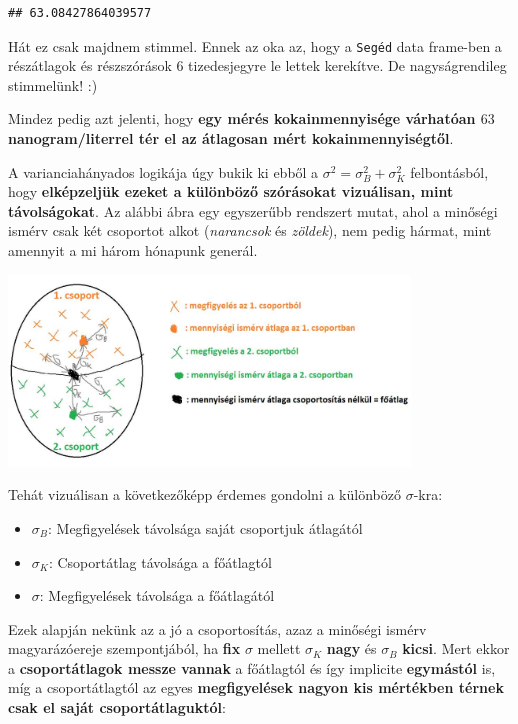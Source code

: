 \documentclass[
]{book}
\providecommand{\tightlist}{%
  \setlength{\itemsep}{0pt}\setlength{\parskip}{0pt}}
\begin{document}
\begin{verbatim}
## 63.08427864039577
\end{verbatim}

Hát ez csak majdnem stimmel. Ennek az oka az, hogy a \texttt{Segéd} data frame-ben a részátlagok és részszórások \(6\) tizedesjegyre le lettek kerekítve. De nagyságrendileg stimmelünk! :)

Mindez pedig azt jelenti, hogy \textbf{egy mérés kokainmennyisége várhatóan \(63\) nanogram/literrel tér el az átlagosan mért kokainmennyiségtől}.

A varianciahányados logikája úgy bukik ki ebből a \(\sigma^2=\sigma_B^2+\sigma_K^2\) felbontásból, hogy \textbf{elképzeljük ezeket a különböző szórásokat vizuálisan, mint távolságokat}. Az alábbi ábra egy egyszerűbb rendszert mutat, ahol a minőségi ismérv csak két csoportot alkot (\emph{narancsok} és \emph{zöldek}), nem pedig hármat, mint amennyit a mi három hónapunk generál.

\includegraphics[width=0.8\textwidth,height=\textheight]{varhanyad1.jpg}

Tehát vizuálisan a következőképp érdemes gondolni a különböző \(\sigma\)-kra:

\begin{itemize}
\tightlist
\item
  \(\sigma_B\): Megfigyelések távolsága saját csoportjuk átlagától
\item
  \(\sigma_K\): Csoportátlag távolsága a főátlagtól
\item
  \(\sigma\): Megfigyelések távolsága a főátlagától
\end{itemize}

Ezek alapján nekünk az a jó a csoportosítás, azaz a minőségi ismérv magyarázóereje szempontjából, ha \textbf{fix} \(\sigma\) mellett \(\sigma_K\) \textbf{nagy} és \(\sigma_B\) \textbf{kicsi}. Mert ekkor a \textbf{csoportátlagok messze vannak} a főátlagtól és így implicite \textbf{egymástól} is, míg a csoportátlagtól az egyes \textbf{megfigyelések nagyon kis mértékben térnek csak el saját csoportátlaguktól}:
\end{document}
